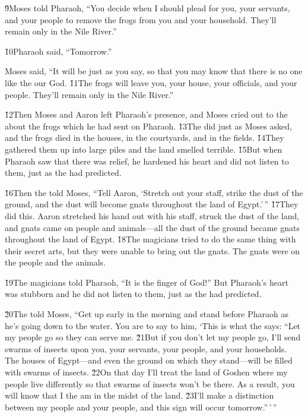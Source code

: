 \v{9}Moses told Pharaoh, ``You decide when I should plead for you, your servants, and your people to remove the frogs from you and your household. They'll remain only in the Nile River.''

\v{10}Pharaoh said, ``Tomorrow.''

Moses said, ``It will be just as you say, so that you may know that there is no one like the  our God. \v{11}The frogs will leave you, your house, your officials, and your people. They'll remain only in the Nile River.''

\v{12}Then Moses and Aaron left Pharaoh's presence, and Moses cried out to the  about the frogs which he had sent on Pharaoh. \v{13}The  did just as Moses asked, and the frogs died in the houses, in the courtyards, and in the fields. \v{14}They gathered them up into large piles and the land smelled terrible. \v{15}But when Pharaoh saw that there was relief, he hardened his heart and did not listen to them, just as the  had predicted.

\v{16}Then the  told Moses, ``Tell Aaron, `Stretch out your staff, strike the dust of the ground, and the dust will become gnats throughout the land of Egypt.'\,'' \v{17}They did this. Aaron stretched his hand out with his staff, struck the dust of the land, and gnats came on people and animals---all the dust of the ground became gnats throughout the land of Egypt. \v{18}The magicians tried to do the same thing with their secret arts, but they were unable to bring out the gnats. The gnats were on the people and the animals.

\v{19}The magicians told Pharaoh, ``It is the finger of God!'' But Pharaoh's heart was stubborn and he did not listen to them, just as the  had predicted.

\v{20}The  told Moses, ``Get up early in the morning and stand before Pharaoh as he's going down to the water. You are to say to him, `This is what the  says: ``Let my people go so they can serve me. \v{21}But if you don't let my people go, I'll send swarms of insects upon you, your servants, your people, and your households. The houses of Egypt---and even the ground on which they stand---will be filled with swarms of insects. \v{22}On that day I'll treat the land of Goshen where my people live differently so that swarms of insects won't be there. As a result, you will know that I the  am in the midst of the land. \v{23}I'll make a distinction between my people and your people, and this sign will occur tomorrow.''\,'\,''

